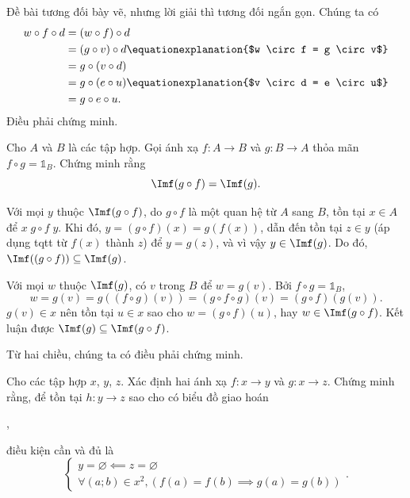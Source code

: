 \solution

Đề bài tương đối bày vẽ, nhưng lời giải thì tương đối ngắn gọn. Chúng ta có 
\begin{align*}
   w \circ f \circ d &= (w \circ f) \circ d \\
   &= (g \circ v) \circ d \equationexplanation{$w \circ f = g \circ v$} \\
   &= g \circ (v \circ d) \\
   &= g \circ (e \circ u) \equationexplanation{$v \circ d = e \circ u$} \\
   &= g \circ e \circ u.
\end{align*}
Điều phải chứng minh.

\exercise Cho $A$ và $B$ là các tập hợp. Gọi ánh xạ $f: A \to B$ và $g: B \to A$ thỏa mãn $f \circ g = \mathds{1}_B$. Chứng minh rằng \begin{equation*}
   \Imf(g \circ f) = \Imf(g).
\end{equation*}

\solution

Với mọi $y$ thuộc $\Imf(g \circ f)$, do $g \circ f$ là một quan hệ từ $A$ sang $B$, tồn tại $x \in A$ để $x\; g \circ f\;y$. Khi đó, $y = (g\circ f)(x) = g(f(x))$, dẫn đến tồn tại $z\in y$ (áp dụng tqtt từ $f(x)$ thành $z$) để $y = g(z)$, và vì vậy $y \in \Imf(g)$. Do đó, $\Imf((g \circ f)) \subseteq \Imf(g)$.

Với mọi $w$ thuộc $\Imf(g)$, có $v$ trong $B$ để $w = g(v)$. Bởi $f \circ g = \mathds{1}_B$, \begin{equation*}
   w = g(v) = g((f\circ g)(v)) = (g \circ f \circ g)(v) = (g \circ f)(g(v)).
\end{equation*}
$g(v) \in x$ nên tồn tại $u \in x$ sao cho $w = (g \circ f)(u)$, hay $w \in \Imf(g \circ f)$. Kết luận được $\Imf(g) \subseteq \Imf(g \circ f)$.

Từ hai chiều, chúng ta có điều phải chứng minh.
 
\exercise Cho các tập hợp $x$, $y$, $z$. Xác định hai ánh xạ $f: x \to y$ và $g: x \to z$. Chứng minh rằng, để tồn tại $h: y \to z$ sao cho có biểu đồ giao hoán
\begin{center}
   ,
\end{center}
điều kiện cần và đủ là \begin{equation*}
   \begin{cases}
      y = \varnothing \impliedby z = \varnothing \\
      \forall (a; b) \in x^2, (f(a) = f(b) \implies g(a) = g(b))
   \end{cases}.
\end{equation*}

